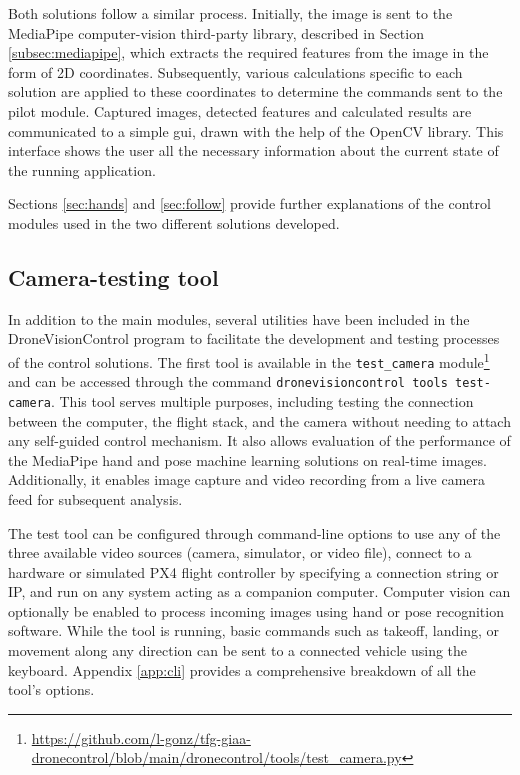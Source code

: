 Both solutions follow a similar process. Initially, the image is sent to the MediaPipe computer-vision third-party library, described in Section \ref{subsec:mediapipe}, which extracts the required features from the image in the form of 2D coordinates. Subsequently, various calculations specific to each solution are applied to these coordinates to determine the commands sent to the pilot module.
Captured images, detected features and calculated results are communicated to a simple \acrshort{gui}, drawn with the help of the OpenCV library. This interface shows the user all the necessary information about the current state of the running application.

Sections \ref{sec:hands} and \ref{sec:follow} provide further explanations of the control modules used in the two different solutions developed.

\subsection{Camera-testing tool}
\label{subsec:cam-tool}

In addition to the main modules, several utilities have been included in the DroneVisionControl program to facilitate the development and testing processes of the control solutions. The first tool is available in the \texttt{test\_camera} module\footnote{\url{https://github.com/l-gonz/tfg-giaa-dronecontrol/blob/main/dronecontrol/tools/test_camera.py}} and can be accessed through the command \texttt{dronevisioncontrol tools test-camera}. This tool serves multiple purposes, including testing the connection between the computer, the flight stack, and the camera without needing to attach any self-guided control mechanism. It also allows evaluation of the performance of the MediaPipe hand and pose machine learning solutions on real-time images. Additionally, it enables image capture and video recording from a live camera feed for subsequent analysis. 

The test tool can be configured through command-line options to use any of the three available video sources (camera, simulator, or video file), connect to a hardware or simulated PX4 flight controller by specifying a connection string or IP, and run on any system acting as a companion computer. Computer vision can optionally be enabled to process incoming images using hand or pose recognition software. While the tool is running, basic commands such as takeoff, landing, or movement along any direction can be sent to a connected vehicle using the keyboard. Appendix \ref{app:cli} provides a comprehensive breakdown of all the tool's options.

